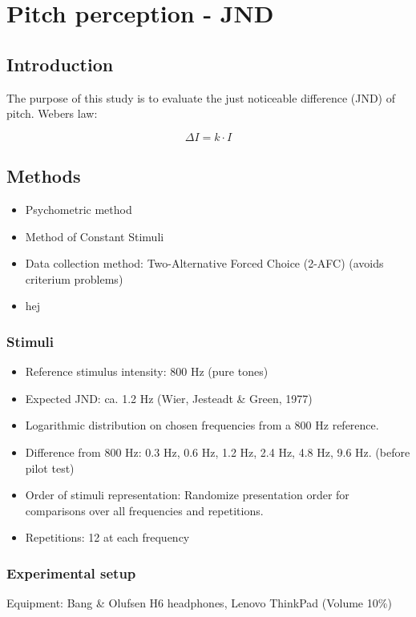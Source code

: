\chapter*{Pitch perception - JND}

\section*{Introduction}
The purpose of this study is to evaluate the just noticeable difference (JND) of pitch.
Webers law:

\begin{equation}
\Delta I = k \cdot I
\end{equation}

\section*{Methods}
%
\begin{itemize}
  \item Psychometric method
  \item Method of Constant Stimuli
  \item Data collection method: Two-Alternative Forced Choice (2-AFC) (avoids criterium problems)
  \item hej
\end{itemize}


\subsection*{Stimuli}
%
\begin{itemize}
\item Reference stimulus intensity: 800 Hz (pure tones)
\item Expected JND: ca. 1.2 Hz (Wier, Jesteadt \& Green, 1977)
\item Logarithmic distribution on chosen frequencies from a 800 Hz reference.
\item Difference from 800 Hz: 0.3 Hz, 0.6 Hz, 1.2 Hz, 2.4 Hz, 4.8 Hz, 9.6 Hz. (before pilot test)
\item Order of stimuli representation: Randomize presentation order for comparisons over all frequencies and repetitions.
\item Repetitions: 12 at each frequency 
\end{itemize}


\subsection*{Experimental setup}
Equipment: Bang \& Olufsen H6 headphones, Lenovo ThinkPad (Volume 10\%)

